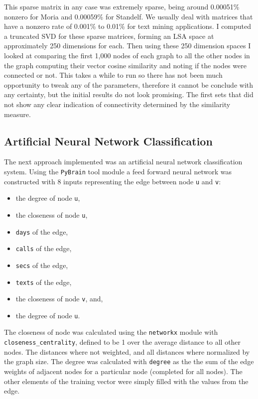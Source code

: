 This sparse matrix in any case was extremely sparse, being around 0.00051\%
nonzero for Moria and 0.00059\% for Standelf.  We usually deal with matrices
that have a nonzero rate of 0.001\% to 0.01\% for text mining applications.  I
computed a truncated SVD for these sparse matrices, forming an LSA space at
approximately 250 dimensions for each.  Then using these 250 dimension spaces
I looked at comparing the first 1,000 nodes of each graph to all the other
nodes in the graph computing their vector cosine similarity and noting if the
nodes were connected or not.  This takes a while to run so there has not been
much opportunity to tweak any of the parameters, therefore it cannot be conclude
with any certainty, but the initial results do not look promising.  The first
sets that did not show any clear indication of connectivity
determined by the similarity measure.

\subsection{Artificial Neural Network Classification}
The next approach implemented was an artificial neural network classification system.
Using the \verb+PyBrain+ tool module a feed forward neural network was constructed with 8 inputs representing the edge between node \texttt{u} and \texttt{v}:
\begin{itemize}
	\item the degree of node \texttt{u},
	\item the closeness of node \texttt{u},
	\item \texttt{days} of the edge,
	\item \texttt{calls} of the edge,
	\item \texttt{secs} of the edge,
	\item \texttt{texts} of the edge,
	\item the closeness of node \texttt{v}, and,
	\item the degree of node \texttt{u}.
\end{itemize}
The closeness of node was calculated using the \verb+networkx+ module with \verb+closeness_centrality+, defined to be 1 over the average distance to all other nodes. The distances where not weighted, and all distances where normalized by the graph size.
The degree was calculated with \verb+degree+ as the the sum of the edge weights of adjacent nodes for a particular node (completed for all nodes).
The other elements of the training vector were simply filled with the values from the edge.

